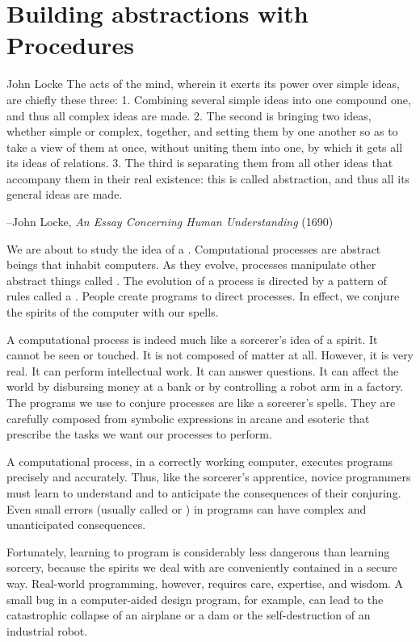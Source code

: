 \mainmatter
\chapter{Building abstractions with Procedures}
\label{chap-1}
\begin{epigraph}{John Locke}
The acts of the mind, wherein it exerts its power over simple ideas,
are chiefly these three: 1. Combining several simple ideas into one
compound one, and thus all complex ideas are made.  2. The second is
bringing two ideas, whether simple or complex, together, and setting
them by one another so as to take a view of them at once, without
uniting them into one, by which it gets all its ideas of relations.
3.  The third is separating them from all other ideas that accompany
them in their real existence: this is called abstraction, and thus all
its general ideas are made.

--John Locke, \textit{An Essay Concerning Human Understanding}
(1690)
\end{epigraph}

We are about to study the idea of a .
Computational processes are abstract beings that inhabit computers.
As they evolve, processes manipulate other abstract things called
.  The evolution of a process is directed by a pattern of
rules called a .  People create programs to direct
processes.  In effect, we conjure the spirits of the computer with our
spells.

A computational process is indeed much like a sorcerer's idea of a
spirit.  It cannot be seen or touched.  It is not composed of matter
at all.  However, it is very real.  It can perform intellectual work.
It can answer questions.  It can affect the world by disbursing money
at a bank or by controlling a robot arm in a factory.  The programs we
use to conjure processes are like a sorcerer's spells.  They are
carefully composed from symbolic expressions in arcane and esoteric
 that prescribe the tasks we want our
processes to perform.

A computational process, in a correctly working computer, executes
programs precisely and accurately.  Thus, like the sorcerer's
apprentice, novice programmers must learn to understand and to
anticipate the consequences of their conjuring.  Even small errors
(usually called  or ) in programs can have
complex and unanticipated consequences.

Fortunately, learning to program is considerably less dangerous than
learning sorcery, because the spirits we deal with are conveniently
contained in a secure way.  Real-world programming, however,
requires care, expertise, and wisdom.  A small bug in a computer-aided
design program, for example, can lead to the catastrophic collapse of
an airplane or a dam or the self-destruction of an industrial robot.

